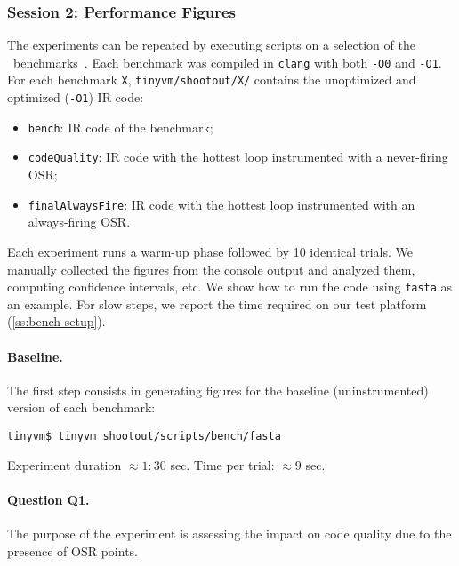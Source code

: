 \subsubsection{Session 2: Performance Figures}

The experiments can be repeated by executing scripts on a selection of the \shootout\ benchmarks~\cite{shootout}. Each benchmark was compiled in {\tt clang} with both {\tt -O0} and {\tt -O1}. For each benchmark {\tt X}, {\tt tinyvm/shootout/X/} contains the unoptimized and optimized ({\tt -O1}) IR code:

\begin{itemize}[parsep=0pt]
\item {\tt bench}: IR code of the benchmark;
\item {\tt codeQuality}: IR code with the hottest loop instrumented with a never-firing OSR;
\item {\tt finalAlwaysFire}: IR code with the hottest loop instrumented with an always-firing OSR.
\end{itemize}

\noindent Each experiment runs a warm-up phase followed by 10 identical trials. We manually collected the figures from the console output and analyzed them, computing confidence intervals, etc. We show how to run the code using {\tt fasta} as an example. For slow steps, we report the time required on our test platform (\mysection\ref{ss:bench-setup}).

\paragraph{Baseline.} The first step consists in generating figures for the baseline (uninstrumented) version of each benchmark:
\begin{small}
\begin{verbatim}
tinyvm$ tinyvm shootout/scripts/bench/fasta
\end{verbatim}
\end{small}

\noindent Experiment duration $\approx1:30$ sec. Time per trial: $\approx9$ sec.

\paragraph{Question Q1.} The purpose of the experiment is assessing the impact on code quality due to the presence of OSR points.






